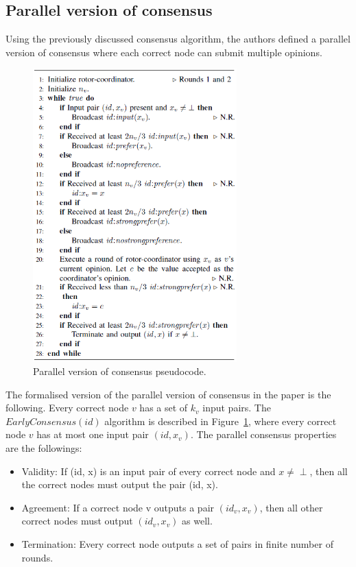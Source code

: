 \documentclass{article}
\begin{document}
\subsection{Parallel version of consensus}
Using the previously discussed consensus algorithm, the authors defined a parallel version of consensus where each correct node can submit multiple opinions.

\begin{figure}[hbt!]
    \centering
    \includegraphics[width=0.70\textwidth]{figures/parallel_consensus.png}
    \caption{Parallel version of consensus pseudocode.\label{parallel_consensus_fig}}
\end{figure}

The formalised version of the parallel version of consensus in the paper is the following. Every correct node \(v\) has a set of \(k_v\) input pairs. 
The \(EarlyConsensus(id)\) algorithm is described in Figure~\ref{parallel_consensus_fig}, where every correct node \(v\) has at most one input pair \((id, x_v)\). The parallel consensus properties are the followings:
\begin{itemize}
  \item Validity: If (id, x) is an input pair of every correct node and \(x \neq \perp\), then all the correct nodes must output the pair (id, x).
  \item Agreement: If a correct node v outputs a pair \((id_v, x_v)\), then all other correct nodes must output \((id_v, x_v)\) as well.
  \item Termination: Every correct node outputs a set of pairs in finite number of rounds.
\end{itemize}
\end{document}
